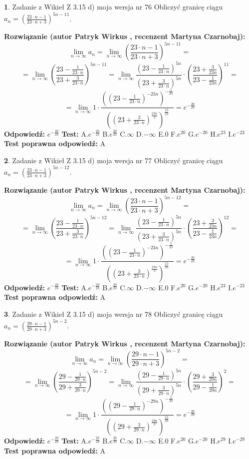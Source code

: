 \documentclass[12pt, a4paper]{article}
\theoremstyle{definition} %
\newtheorem{zad}{}
\newcommand{\zadStart}[1]{\begin{zad}#1\newline}
\newcommand{\zadStop}{\end{zad}}
\newcommand{\rozwStart}[2]{\noindent \textbf{Rozwiązanie (autor #1 , recenzent #2): }\newline}
\newcommand{\rozwStop}{\newline}
\newcommand{\odpStart}{\noindent \textbf{Odpowiedź:}\newline}
\newcommand{\odpStop}{\newline}
\newcommand{\testStart}{\noindent \textbf{Test:}\newline}
\newcommand{\testStop}{\newline}
\newcommand{\kluczStart}{\noindent \textbf{Test poprawna odpowiedź:}\newline}
\newcommand{\kluczStop}{\newline}
\begin{document}
\zadStart{Zadanie z Wikieł Z 3.15 d) moja wersja nr 76}
Obliczyć granicę ciągu $a_{n}=(\frac{23\cdot n - 1}{23 \cdot n + 3})^{5n-11}$.
\zadStop
\rozwStart{Patryk Wirkus}{Martyna Czarnobaj}
$$\lim\limits_{n\to\infty} a_{n} = \lim\limits_{n\to\infty}(\frac{23\cdot n - 1}{23 \cdot n + 3})^{5n-11}=$$
$$=\lim\limits_{n\to\infty}(\frac{23 - \frac{1}{23\cdot n}}{23 + \frac{3}{23 \cdot n}})^{5n-11}=\lim\limits_{n\to\infty}\frac{(23 - \frac{1}{23\cdot n})^{5n}}{(23 + \frac{3}{23\cdot n})^{5n}} \cdot (\frac{23+\frac{3}{23n}}{23-\frac{1}{23n}})^{11}=$$
$$=\lim\limits_{n\to\infty} 1 \cdot \frac{((23-\frac{1}{23 \cdot n})^{-23n})^{-\frac{5}{23}}}{((23+\frac{3}{23 \cdot n})^{\frac{23n}{3}})^{\frac{15}{23}}} =e^{-\frac{20}{23}}$$
\rozwStop
\odpStart
$e^{-\frac{20}{23}}$
\odpStop
\testStart
A.$ e^{-\frac{20}{23}}$
B.$ e^{\frac{20}{23}}$
C.$\infty$
D.$-\infty$
E.$0$
F.$e^{20}$
G.$e^{-20}$
H.$e^{23}$
I.$e^{-23}$
\testStop
\kluczStart
A
\kluczStop



\zadStart{Zadanie z Wikieł Z 3.15 d) moja wersja nr 77}
Obliczyć granicę ciągu $a_{n}=(\frac{23\cdot n - 1}{23 \cdot n + 3})^{5n-12}$.
\zadStop
\rozwStart{Patryk Wirkus}{Martyna Czarnobaj}
$$\lim\limits_{n\to\infty} a_{n} = \lim\limits_{n\to\infty}(\frac{23\cdot n - 1}{23 \cdot n + 3})^{5n-12}=$$
$$=\lim\limits_{n\to\infty}(\frac{23 - \frac{1}{23\cdot n}}{23 + \frac{3}{23 \cdot n}})^{5n-12}=\lim\limits_{n\to\infty}\frac{(23 - \frac{1}{23\cdot n})^{5n}}{(23 + \frac{3}{23\cdot n})^{5n}} \cdot (\frac{23+\frac{3}{23n}}{23-\frac{1}{23n}})^{12}=$$
$$=\lim\limits_{n\to\infty} 1 \cdot \frac{((23-\frac{1}{23 \cdot n})^{-23n})^{-\frac{5}{23}}}{((23+\frac{3}{23 \cdot n})^{\frac{23n}{3}})^{\frac{15}{23}}} =e^{-\frac{20}{23}}$$
\rozwStop
\odpStart
$e^{-\frac{20}{23}}$
\odpStop
\testStart
A.$ e^{-\frac{20}{23}}$
B.$ e^{\frac{20}{23}}$
C.$\infty$
D.$-\infty$
E.$0$
F.$e^{20}$
G.$e^{-20}$
H.$e^{23}$
I.$e^{-23}$
\testStop
\kluczStart
A
\kluczStop



\zadStart{Zadanie z Wikieł Z 3.15 d) moja wersja nr 78}
Obliczyć granicę ciągu $a_{n}=(\frac{29\cdot n - 1}{29 \cdot n + 3})^{5n-2}$.
\zadStop
\rozwStart{Patryk Wirkus}{Martyna Czarnobaj}
$$\lim\limits_{n\to\infty} a_{n} = \lim\limits_{n\to\infty}(\frac{29\cdot n - 1}{29 \cdot n + 3})^{5n-2}=$$
$$=\lim\limits_{n\to\infty}(\frac{29 - \frac{1}{29\cdot n}}{29 + \frac{3}{29 \cdot n}})^{5n-2}=\lim\limits_{n\to\infty}\frac{(29 - \frac{1}{29\cdot n})^{5n}}{(29 + \frac{3}{29\cdot n})^{5n}} \cdot (\frac{29+\frac{3}{29n}}{29-\frac{1}{29n}})^{2}=$$
$$=\lim\limits_{n\to\infty} 1 \cdot \frac{((29-\frac{1}{29 \cdot n})^{-29n})^{-\frac{5}{29}}}{((29+\frac{3}{29 \cdot n})^{\frac{29n}{3}})^{\frac{15}{29}}} =e^{-\frac{20}{29}}$$
\rozwStop
\odpStart
$e^{-\frac{20}{29}}$
\odpStop
\testStart
A.$ e^{-\frac{20}{29}}$
B.$ e^{\frac{20}{29}}$
C.$\infty$
D.$-\infty$
E.$0$
F.$e^{20}$
G.$e^{-20}$
H.$e^{29}$
I.$e^{-29}$
\testStop
\kluczStart
A
\kluczStop
\end{document}
